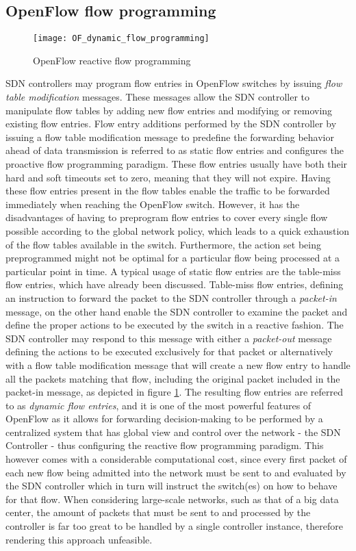 \subsection{OpenFlow flow programming}
\label{subsection:openflow-flow-programming}
%
\begin{figure}
	\centering
	\texttt{[image: OF\_dynamic\_flow\_programming]}
	\caption{OpenFlow reactive flow programming}
	\label{fig:OF_dynamic_flow_programming}
\end{figure}
%
\gls{SDN} controllers may program flow entries in OpenFlow switches by issuing \emph{flow table modification} messages.
These messages allow the \gls{SDN} controller to manipulate flow tables by adding new flow entries and modifying or removing existing flow entries.
Flow entry additions performed by the \gls{SDN} controller by issuing a flow table modification message to predefine the forwarding behavior ahead of data transmission is referred to as static flow entries and configures the proactive flow programming paradigm.
These flow entries usually have both their hard and soft timeouts set to zero, meaning that they will not expire\cite{OF13}.
Having these flow entries present in the flow tables enable the traffic to be forwarded immediately when reaching the OpenFlow switch.
However, it has the disadvantages of having to preprogram flow entries to cover every single flow possible according to the global network policy, which leads to a quick exhaustion of the flow tables available in the switch.
Furthermore, the action set being preprogrammed might not be optimal for a particular flow being processed at a particular point in time.
A typical usage of static flow entries are the table-miss flow entries, which have already been discussed.
%
Table-miss flow entries, defining an instruction to forward the packet to the \gls{SDN} controller through a \emph{packet-in} message, on the other hand enable the \gls{SDN} controller to examine the packet and define the proper actions to be executed by the switch in a reactive fashion.
The \gls{SDN} controller may respond to this message with either a \emph{packet-out} message defining the actions to be executed exclusively for that packet or alternatively with a flow table modification message that will create a new flow entry to handle all the packets matching that flow, including the original packet included in the packet-in message\cite{OF13}, as depicted in figure \ref{fig:OF_dynamic_flow_programming}.
%
The resulting flow entries are referred to as \emph{dynamic flow entries}, and it is one of the most powerful features of OpenFlow as it allows for forwarding decision-making to be performed by a centralized system that has global view and control over the network - the SDN Controller - thus configuring the reactive flow programming paradigm.
This however comes with a considerable computational cost, since every first packet of each new flow being admitted into the network must be sent to and evaluated by the \gls{SDN} controller which in turn will instruct the switch(es) on how to behave for that flow.
When considering large-scale networks, such as that of a big data center, the amount of packets that must be sent to and processed by the controller is far too great to be handled by a single controller instance, therefore rendering this approach unfeasible.
%